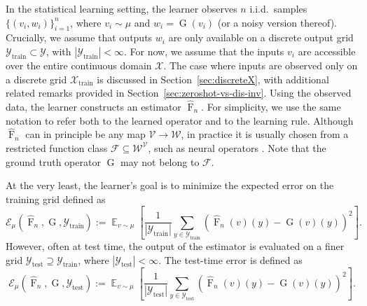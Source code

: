 \documentclass[11pt]{article}
\theoremstyle{plain}
\newcommand{\Fcal}{\mathcal{F}}
\newcommand{\Xcal}{\mathcal{X}}
\newcommand{\Ycal}{\mathcal{Y}}
\newcommand{\Vcal}{\mathcal{V}}
\newcommand{\Wcal}{\mathcal{W}}
\newcommand{\Ecal}{\mathcal{E}}
\DeclareMathOperator*{\expect}{\mathbb{E}}
\begin{document}
In the statistical learning setting, the learner observes $ n $ i.i.d.\ samples $ \{(v_i, w_i)\}_{i=1}^n $, where $ v_i \sim \mu $ and $ w_i = \operatorname{G}(v_i) $ (or a noisy version thereof). Crucially, we assume that outputs $ w_i $ are only available on a discrete output grid $ \Ycal_{\mathrm{train}} \subset \Ycal $, with $ |\Ycal_{\mathrm{train}}| < \infty $. For now, we assume that the inputs $ v_i $ are accessible over the entire continuous domain $ \Xcal $. The case where inputs are observed only on a discrete grid $ \Xcal_{\mathrm{train}} $ is discussed in Section~\ref{sec:discreteX}, with additional related remarks provided in Section~\ref{sec:zeroshot-vs-dis-inv}. Using the observed data, the learner constructs an estimator $ \widehat{\operatorname{F}}_n $. For simplicity, we use the same notation to refer both to the learned operator and to the learning rule. Although $ \widehat{\operatorname{F}}_n $ can in principle be any map $ \Vcal \to \Wcal $, in practice it is usually chosen from a restricted function class $ \Fcal \subseteq \Wcal^{\Vcal} $, such as neural operators \citep{kovachki2023neural}. Note that the ground truth operator $ \operatorname{G} $ may not belong to $ \Fcal $.

At the very least, the learner's goal is to minimize the expected error on the training grid defined as
\[
\Ecal_{\mu}(\widehat{\operatorname{F}}_n, \operatorname{G}, \Ycal_{\mathrm{train}}) := \expect_{v \sim \mu} \left[ \frac{1}{|\Ycal_{\mathrm{train}}|} \sum_{y \in \Ycal_{\mathrm{train}}} \left( \widehat{\operatorname{F}}_n(v)(y) - \operatorname{G}(v)(y) \right)^2 \right].
\]
However, often at test time, the output of the estimator is evaluated on a finer grid $ \Ycal_{\mathrm{test}} \supseteq \Ycal_{\mathrm{train}} $, where $ |\Ycal_{\mathrm{test}}| < \infty $. The test-time error is defined as
\[
\mathcal{E}_{\mu}(\widehat{\operatorname{F}}_n, \operatorname{G}, \Ycal_{\mathrm{test}}) := \expect_{v \sim \mu} \left[ \frac{1}{|\Ycal_{\mathrm{test}}|} \sum_{y \in \Ycal_{\mathrm{test}}} \left( \widehat{\operatorname{F}}_n(v)(y) - \operatorname{G}(v)(y) \right)^2 \right].
\]
\end{document}

